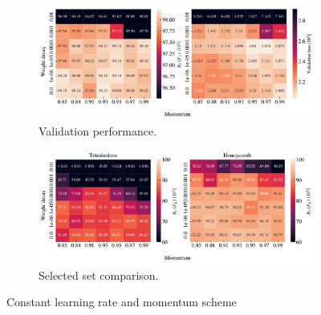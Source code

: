 \begin{figure}[H]
  \centering
  \begin{subfigure}[t]{1.0\textwidth}
      \centering
      \includegraphics[width=\textwidth]{figures/ML/mom_weight_search_constant_perf.pdf}
      \caption{Validation performance.}
  \end{subfigure}
  \hfill
  \begin{subfigure}[t]{1.0\textwidth}
      \centering
      \includegraphics[width=\textwidth]{figures/ML/mom_weight_search_compare_constant_perf.pdf}
      \caption{Selected set comparison.}
  \end{subfigure}
  \hfill
  \caption{Constant learning rate and momentum scheme}
  \label{fig:mom_weight_search_constant}
\end{figure}

